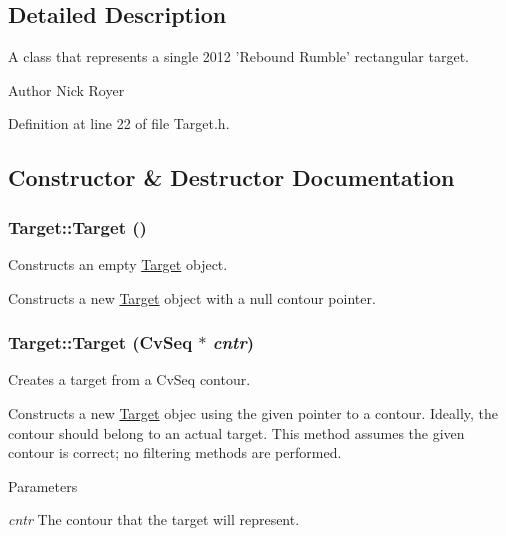 \subsection{Detailed Description}
A class that represents a single 2012 'Rebound Rumble' rectangular target. \begin{DoxyAuthor}{Author}
Nick Royer 
\end{DoxyAuthor}


Definition at line 22 of file Target.h.



\subsection{Constructor \& Destructor Documentation}
\hypertarget{classTarget_a7008d6752ce64f82e56aae6ea6c2bb65}{
\subsubsection[{Target}]{\setlength{\rightskip}{0pt plus 5cm}Target::Target ()}}
\label{classTarget_a7008d6752ce64f82e56aae6ea6c2bb65}


Constructs an empty \hyperlink{classTarget}{Target} object. 

Constructs a new \hyperlink{classTarget}{Target} object with a null contour pointer. \hypertarget{classTarget_a2275921d41d2d55f196ed5b7eb8d2c72}{
\subsubsection[{Target}]{\setlength{\rightskip}{0pt plus 5cm}Target::Target (CvSeq $\ast$ {\em cntr})}}
\label{classTarget_a2275921d41d2d55f196ed5b7eb8d2c72}


Creates a target from a CvSeq contour. 

Constructs a new \hyperlink{classTarget}{Target} objec using the given pointer to a contour. Ideally, the contour should belong to an actual target. This method assumes the given contour is correct; no filtering methods are performed. 
\begin{DoxyParams}{Parameters}
\item[{\em cntr}]The contour that the target will represent. \end{DoxyParams}



